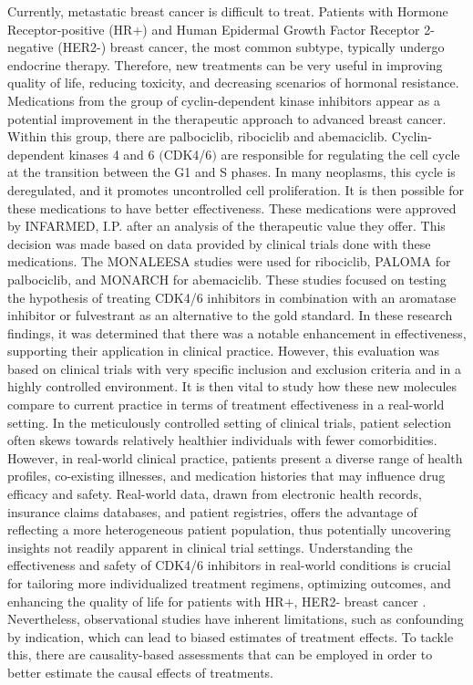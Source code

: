 Currently, metastatic breast cancer is difficult to treat. Patients with Hormone Receptor-positive (HR+) and Human Epidermal Growth Factor Receptor 2-negative (HER2-) breast cancer, the most common subtype, typically undergo endocrine therapy. Therefore, new treatments can be very useful in improving quality of life, reducing toxicity, and decreasing scenarios of hormonal resistance.
Medications from the group of cyclin-dependent kinase inhibitors appear as a potential improvement in the therapeutic approach to advanced breast cancer. Within this group, there are palbociclib, ribociclib and abemaciclib. Cyclin-dependent kinases 4 and 6 $($CDK4/6$)$ are responsible for regulating the cell cycle at the transition between the G1 and S phases. In many neoplasms, this cycle is deregulated, and it promotes uncontrolled cell proliferation. It is then possible for these medications to have better effectiveness. These medications were approved by INFARMED, I.P. after an analysis of the therapeutic value they offer. This decision was made based on data provided by clinical trials done with these medications. The MONALEESA \cite{hortobagyiUpdatedResultsMONALEESA22018, slamonPhaseIIIRandomized2018, tripathyRibociclibEndocrineTherapy2018} studies were used for ribociclib, PALOMA \cite{vermaPalbociclibCombinationFulvestrant2016, rugoImpactPalbociclibLetrozole2018, finnCyclindependentKinaseInhibitor2015a} for palbociclib, and MONARCH \cite{goetzMONARCHAbemaciclibInitial2017, sledgeMONARCHAbemaciclibCombination2017} for abemaciclib.
These studies focused on testing the hypothesis of treating CDK4/6 inhibitors in combination with an aromatase inhibitor or fulvestrant as an alternative to the gold standard. In these research findings, it was determined that there was a notable enhancement in effectiveness, supporting their application in clinical practice.
However, this evaluation was based on clinical trials with very specific inclusion and exclusion criteria and in a highly controlled environment. It is then vital to study how these new molecules compare to current practice in terms of treatment effectiveness in a real-world setting. In the meticulously controlled setting of clinical trials, patient selection often skews towards relatively healthier individuals with fewer comorbidities. However, in real-world clinical practice, patients present a diverse range of health profiles, co-existing illnesses, and medication histories that may influence drug efficacy and safety. Real-world data, drawn from electronic health records, insurance claims databases, and patient registries, offers the advantage of reflecting a more heterogeneous patient population, thus potentially uncovering insights not readily apparent in clinical trial settings. Understanding the effectiveness and safety of CDK4/6 inhibitors in real-world conditions is crucial for tailoring more individualized treatment regimens, optimizing outcomes, and enhancing the quality of life for patients with HR+, HER2- breast cancer \cite{harbeckCDK4InhibitorsHR2021}. Nevertheless, observational studies have inherent limitations, such as confounding by indication, which can lead to biased estimates of treatment effects. To tackle this, there are causality-based assessments that can be employed in order to better estimate the causal effects of treatments.
